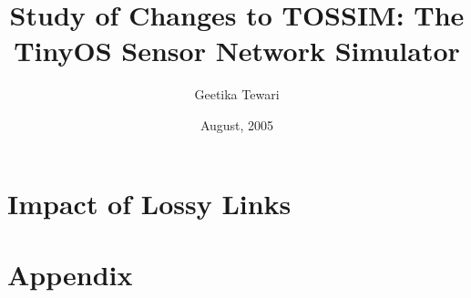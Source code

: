 \documentclass[10pt]{article}
\title{Study of Changes to TOSSIM: The TinyOS Sensor Network Simulator}
\author{Geetika Tewari}
\date{August, 2005}
\begin{document}
\maketitle


\section{ Impact of Lossy Links}

\section{Appendix}

\end{document}
